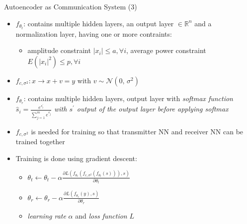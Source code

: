 \documentclass[xcolor=table,mathserif,9pt]{beamer}    %
\begin{document}
\begin{frame}{Autoencoder as Communication System (3)}

	\vspace{1em}
	\begin{itemize}
		\item $f_{\theta_t}$: contains multiple hidden layers, an output layer $ \in \mathbb{R}^n$ and a normalization layer, having one or more contraints:
		\begin{itemize}
			\item amplitude constraint $|x_i| \le a, \forall i$, average power constraint $E(|x_i|^2) \le p, \forall i$ 
		\end{itemize}
		\item $f_{c, \sigma^2}: x \to x + v = y$ with $v \sim \mathcal{N}(0,\,\sigma^{2})$
		\item $f_{\theta_r}$: contains multiple hidden layers, output layer with \emph{softmax function $\hat{s}_i = \frac{e^{s_i^{'}}}{\sum_{j=1}^m e^{s_j^{'}}}$ 
			with $s^{'}$ output of the output layer before applying softmax}
	\end{itemize}

	\vspace{1em}
	\vspace{1em}
	\begin{itemize}
		\item $f_{c, \sigma^2}$ is needed for training so that transmitter NN and receiver NN can be trained together
		\item Training is done using gradient descent:
			\begin{itemize}
				\item $\theta_t \leftarrow \theta_t - \alpha \frac{\partial L(f_{\theta_r}(f_{c, \sigma^2}(f_{\theta_t}(s))),s)}{\partial \theta_t}$ 
				\item $\theta_r \leftarrow \theta_r - \alpha \frac{\partial L(f_{\theta_r}(y),s)}{\partial \theta_r}$ 
				\item \emph{learning rate} $\alpha$ and \emph{loss function} $L$
			\end{itemize}
		
	\end{itemize}

\end{frame}
\end{document}
